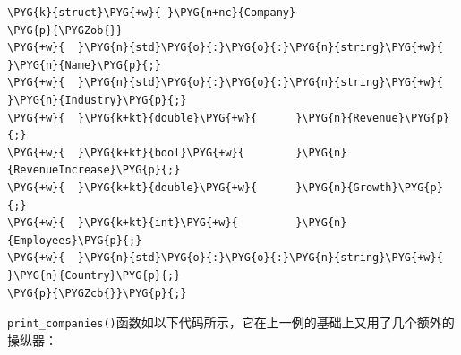 \begin{codeblockbg}
\begin{Verbatim}[commandchars=\\\{\},breaklines=true,breakanywhere=true,fontsize=\codefont,xleftmargin=17bp]
\PYG{k}{struct}\PYG{+w}{ }\PYG{n+nc}{Company}
\PYG{p}{\PYGZob{}}
\PYG{+w}{  }\PYG{n}{std}\PYG{o}{:}\PYG{o}{:}\PYG{n}{string}\PYG{+w}{ }\PYG{n}{Name}\PYG{p}{;}
\PYG{+w}{  }\PYG{n}{std}\PYG{o}{:}\PYG{o}{:}\PYG{n}{string}\PYG{+w}{ }\PYG{n}{Industry}\PYG{p}{;}
\PYG{+w}{  }\PYG{k+kt}{double}\PYG{+w}{      }\PYG{n}{Revenue}\PYG{p}{;}
\PYG{+w}{  }\PYG{k+kt}{bool}\PYG{+w}{        }\PYG{n}{RevenueIncrease}\PYG{p}{;}
\PYG{+w}{  }\PYG{k+kt}{double}\PYG{+w}{      }\PYG{n}{Growth}\PYG{p}{;}
\PYG{+w}{  }\PYG{k+kt}{int}\PYG{+w}{         }\PYG{n}{Employees}\PYG{p}{;}
\PYG{+w}{  }\PYG{n}{std}\PYG{o}{:}\PYG{o}{:}\PYG{n}{string}\PYG{+w}{ }\PYG{n}{Country}\PYG{p}{;}
\PYG{p}{\PYGZcb{}}\PYG{p}{;}
\end{Verbatim}
\end{codeblockbg}



\texttt{print\_\allowbreak{}companies()}函数如以下代码所示，它在上一例的基础上又用了几个额外的操纵器：



